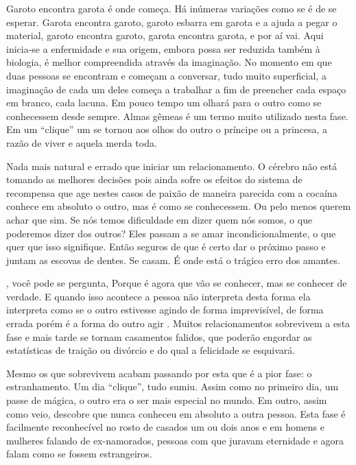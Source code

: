 Garoto encontra garota\mudanca{:} é onde começa. Há inúmeras variações\mudanca{,} como se é de se esperar. Garota encontra garoto, garoto esbarra em garota e a ajuda a pegar o material, garoto encontra garoto, garota encontra garota, e por aí vai. Aqui inicia-se a enfermidade e sua origem, embora possa ser reduzida também à biologia, é melhor compreendida através da imaginação. No momento em que duas pessoas se encontram e começam a conversar, tudo muito superficial, a imaginação de cada um deles começa a trabalhar a fim de preencher cada espaço em branco, cada lacuna. Em pouco tempo\mudanca{,} um olhará para o outro como se conhecessem desde sempre. Almas gêmeas é um termo muito utilizado nesta fase. Em um ``clique''\mudanca{,} um se tornou\mudanca{,} aos olhos do outro\mudanca{,} o príncipe ou a princesa, a razão de viver\mudanca{,} e aquela merda toda.

Nada mais natural e errado  que iniciar um relacionamento. O cérebro não está tomando as melhores decisões\mudanca{,} pois ainda sofre os efeitos do sistema de recompensa que age nestes casos de paixão de maneira parecida com a cocaína conhece em absoluto o outro, mas é como se conhecessem. Ou pelo menos querem achar que sim. Se nós temos dificuldade em dizer quem nós somos, o que poderemos dizer dos outros? Eles passam a se amar incondicionalmente, o que quer que isso signifique. Então  seguros de que é certo dar o próximo passo e juntam as escovas de dentes. Se casam. É onde está o trágico erro dos amantes.

, você pode se pergunta,  Porque é agora que vão se conhecer, mas se conhecer de verdade. E quando isso acontece\mudanca{,} a pessoa não interpreta desta forma\mudanca{:} ela interpreta como se o outro estivesse agindo de forma imprevisível, de forma errada\mudanca{;} porém\mudanca{,} é a forma do outro agir . Muitos relacionamentos sobrevivem a esta fase e mais tarde se tornam casamentos falidos, que poderão engordar as estatísticas de traição ou divórcio\mudanca{,} e do qual a felicidade se esquivará.

Mesmo os que sobrevivem acabam passando por esta que é a pior fase: o estranhamento. Um dia\mudanca{,} ``clique'', tudo sumiu. Assim como no primeiro dia,  um passe de mágica, o outro era o ser mais especial no mundo. Em outro, assim como veio, descobre que nunca conheceu em absoluto a outra pessoa. Esta fase é facilmente reconhecível no rosto de casados  um ou dois anos\mudanca{,} e em homens e mulheres falando de ex-namorados, pessoas com que juravam eternidade e agora falam como se fossem estrangeiros.

